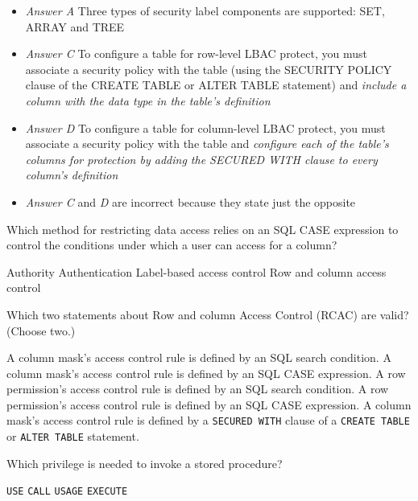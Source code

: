 \documentclass[answers, 11pt]{exam}
\begin{document}
\begin{questions}
\begin{solution}
\begin{itemize}
\item \textit{Answer A} Three types of security label components are supported: SET, ARRAY and TREE
\item \textit{Answer C} To configure a table for row-level LBAC protect, you must associate a security 
policy with the table (using the SECURITY POLICY clause of the CREATE TABLE or ALTER TABLE statement) and
\textit{include a column with the data type in the table's definition}
\item \textit{Answer D} To configure a table for column-level LBAC protect, you must associate a security
policy with the table and \textit{configure each of the table's columns for protection by adding the
SECURED WITH clause to every column's definition}
\item \textit{Answer C} and \textit{D} are incorrect because they state just the opposite
\end{itemize}
\end{solution}

\question[1]
Which method for restricting data access relies on an SQL CASE expression to control the conditions
under which a user can access for a column?
\begin{choices}
\choice Authority
\choice Authentication
\choice Label-based access control
\CorrectChoice Row and column access control
\end{choices}

\question[1]
Which two statements about Row and column Access Control (RCAC) are valid? (Choose two.)
\begin{choices}
\choice A column mask's access control rule is defined by an SQL search condition.
\CorrectChoice A column mask's access control rule is defined by an SQL CASE expression.
\CorrectChoice A row permission's access control rule is defined by an SQL search condition.
\choice A row permission's access control rule is defined by an SQL CASE expression.
\choice A column mask's access control rule is defined by a \texttt{SECURED WITH} clause of 
a \texttt{CREATE TABLE} or \texttt{ALTER TABLE} statement.
\end{choices}

\newpage

\question[1]
Which privilege is needed to invoke a stored procedure?
\begin{choices}
\choice \texttt{USE}
\choice \texttt{CALL}
\choice \texttt{USAGE}
\CorrectChoice \texttt{EXECUTE}
\end{choices}


\end{questions}
\end{document}
